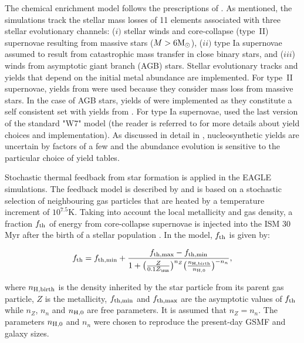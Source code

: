 \documentclass[useAMS,usenatbib]{mn2e}
\begin{document}
The chemical enrichment model follows the prescriptions of \citet{wiersma2009b}.
As mentioned, the simulations track the stellar mass losses of 11 elements associated with
three stellar evolutionary channels:
($i)$ stellar winds and core-collapse (type~II) supernovae resulting from massive stars ($M>6{\rm M}_\odot$), 
($ii)$ type Ia supernovae assumed to result from catastrophic mass transfer in close binary stars, 
and ($iii$) winds from asymptotic giant branch (AGB) stars. Stellar evolutionary tracks and 
yields that depend on the initial metal abundance
are implemented.
For type~II supernovae, yields from \citet{portinari1998} were used because 
they consider mass loss from massive stars.  In the case of AGB stars, 
yields of \citet{marigo2001} were implemented as they constitute a self consistent set 
with yields from \citet{portinari1998}.
For type Ia supernovae, \citet{wiersma2009b}
used the last version of the standard "W7" model \citep{thielemann2003} (the reader is referred
to \citealt{wiersma2009b} for more details about yield choices and implementation).
As discussed in detail in \citet{wiersma2009b}, nucleosynthetic yields are uncertain by factors
of a few and the abundance evolution is sensitive to the particular
choice of yield tables.

Stochastic thermal feedback from star formation is applied in the {\sc EAGLE} simulations. 
The feedback model is described by
\citet{dallavecchia2012} and is based on a stochastic selection of neighbouring gas 
particles that are heated by a temperature increment of $10^{7.5}$K.  Taking into account the local
metallicity and gas density, a fraction $f_{\rm th}$ of energy from core-collapse supernovae
is injected into the ISM 30 Myr after the birth of a stellar population \citep{schaye2015, crain2015}.
In the model, $f_{\rm th}$ is given by:

\begin{equation}
\label{eq:fth}
f_{\rm th} = f_{\rm th,min} + 
\frac{f_{\rm th,max}-f_{\rm th,min}}{1 + \big( \frac{Z}{0.1 Z_{\sun}} \big) ^{n_Z} 
\big( \frac{n_{\rm H, birth}}{n_{\rm H,0}} \big) ^{-n_n}}  , 
\end{equation}

\noindent
where $n_{\rm H, birth}$ is the density inherited 
by the star particle from its parent gas particle, $Z$ is the metallicity, 
$f_{\rm th,min}$ and $f_{\rm th,max}$ are the asymptotic values of $f_{\rm th}$ 
while $n_Z$, $n_n$ and $n_{\rm H,0}$ are free parameters.
It is assumed that $n_Z = n_n$.
The parameters $n_{\rm H,0}$ and $n_n$ were chosen to reproduce the present-day GSMF and galaxy sizes.
\end{document}
